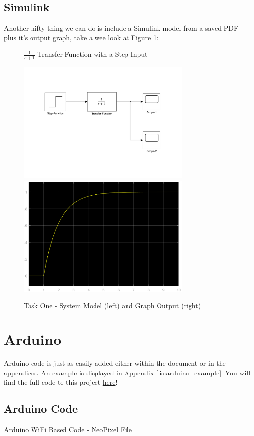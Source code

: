 \documentclass[11pt,a4paper,normalphoto,withhyper]{altareport}
\begin{document}
\subsection{Simulink}
Another nifty thing we can do is include a Simulink model from a saved PDF plus it's output graph, take a wee look at Figure \ref{fig:example_model_graph}:
\bigskip
\begin{figure}[htbp!]
    \centering
    {$\frac{1}{s + 1}$ Transfer Function with a Step Input}\par\medskip
    \includegraphics[width=8.5cm,valign=c]{MATLAB/Simulink/simulink_model.pdf}\hfill\includegraphics[width=8.5cm,valign=c]{MATLAB/Simulink/graph_example.eps}    
    \caption{Task One - System Model (left) and Graph Output (right)}
    \label{fig:example_model_graph}
\end{figure}
\newpage


\section{Arduino}
Arduino code is just as easily added either within the document or in the appendices. An example is displayed in Appendix \ref{lis:arduino_example}. You will find the full code to this project \href{https://github.com/mjennings061/primary-engineer/tree/Wi-Fi}{here}!
\bigskip

\newpage
{}  %
\printbibliography
\newpage


\begin{appendices}
    \section{Arduino Code}
    {Arduino WiFi Based Code - NeoPixel File}
    
\end{appendices}
\end{document}
